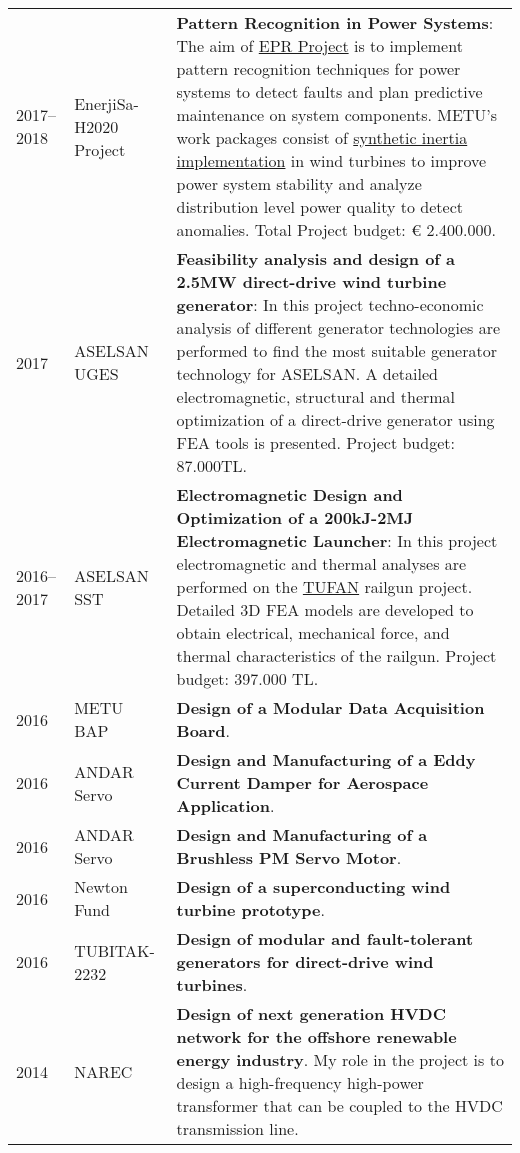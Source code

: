 \documentclass[a4paper,12pt]{article}
\begin{document}
\begin{longtable}{lp{3cm}p{12cm}}
2017--2018 & EnerjiSa-H2020 Project & \textbf{Pattern Recognition in Power Systems}: The aim of \href{http://europeanpatternrecognition.eu/}{EPR Project} is to implement pattern recognition techniques for power systems to detect faults and plan predictive maintenance on system components. METU’s work packages consist of \href{https://www.youtube.com/watch?v=_52WUWsKuXA&feature=youtu.be}{synthetic inertia implementation} in wind turbines to improve power system stability and analyze distribution level power quality to detect anomalies. Total Project budget: € 2.400.000.\\

2017 & ASELSAN UGES & \textbf{Feasibility analysis and design of a 2.5MW direct-drive wind turbine generator}: In this project techno-economic analysis of different generator technologies are performed to find the most suitable generator technology for ASELSAN. A detailed electromagnetic, structural and thermal optimization of a direct-drive generator using FEA tools is presented. Project budget: 87.000TL.\\

2016--2017 & ASELSAN SST & \textbf{Electromagnetic Design and Optimization of a 200kJ-2MJ Electromagnetic Launcher}: In this project electromagnetic and thermal analyses are performed on the \href{http://www.millisavunma.com/aselsan-tufan-elektromanyetik-top-sistemi/}{TUFAN} railgun project. Detailed 3D FEA models are developed to obtain electrical, mechanical force, and thermal characteristics of the railgun. Project budget: 397.000 TL.\\

2016 & METU BAP & \textbf{Design of a Modular Data Acquisition Board}.\\

2016 & ANDAR Servo & \textbf{Design and Manufacturing of a Eddy Current Damper for Aerospace Application}.\\

2016 & ANDAR Servo & \textbf{Design and Manufacturing of a Brushless PM Servo Motor}.\\

2016 & Newton Fund & \textbf{Design of a superconducting wind turbine prototype}.\\

2016 & TUBITAK-2232 & \textbf{Design of modular and fault-tolerant generators for direct-drive wind turbines}.\\

2014 & NAREC & \textbf{Design of next generation HVDC network for the offshore renewable energy industry}. My role in the project is to design a high-frequency high-power transformer that can be coupled to the HVDC transmission line.\\


\end{longtable}
\end{document}
